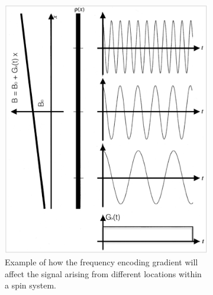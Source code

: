 \begin{figure}[ht]
    \centering
    \begin{subfigure}[b]{0.48\textwidth}
        \includegraphics[width=\textwidth]{images/mri/ch10freqenc}
        \caption{Example of how the frequency encoding gradient will affect the signal arising from different locations within a spin system.}
        \label{fig:ch10freqenc}
    \end{subfigure}
    ~ %
    \begin{subfigure}[b]{0.48\textwidth}

\end{subfigure}
\end{figure}
